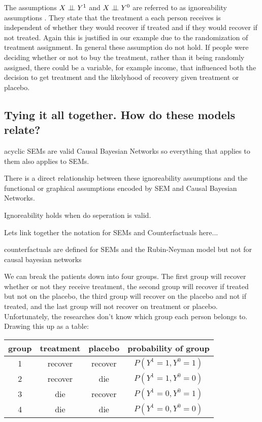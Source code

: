 \documentclass[11pt,a4paper]{article}
\begin{document}
The assumptions $X \perp\!\!\!\perp Y^{1}$ and $X \perp\!\!\!\perp Y^{0}$  are referred to as ignoreability assumptions \cite{}. They state that the treatment a each person receives is independent of whether they would recover if treated and if they would recover if not treated. Again this is justified in our example due to the randomization of treatment assignment. In general these assumption do not hold. If people were deciding whether or not to buy the treatment, rather than it being randomly assigned, there could be a variable, for example income, that influenced both the decision to get treatment and the likelyhood of recovery given treatment or placebo.



\subsection{Tying it all together. How do these models relate?}
acyclic SEMs are valid Causal Bayesian Networks so everything that applies to them also applies to SEMs.

There is a direct relationship between these ignoreability assumptions and the functional or graphical assumptions encoded by SEM and Causal Bayesian Networks.  

Ignoreability holds when do seperation is valid.

Lets link together the notation for SEMs and Counterfactuals here... 

counterfactuals are defined for SEMs and the Rubin-Neyman model but not for causal bayesian networks

We can break the patients down into four groups. The first group will recover whether or not they receive treatment, the second group will recover if treated but not on the placebo, the third group will recover on the placebo and not if treated, and the last group will not recover on treatment or placebo. Unfortunately, the researches don't know which group each person belongs to. Drawing this up as a table:

\begin{tabular}{c|c|c|c}
group & treatment & placebo & probability of group\\
\hline
1 & recover & recover & $P(Y^{1}=1,Y^{0}=1)$\\
2 & recover & die & $P(Y^{1}=1,Y^{0}=0)$\\
3 & die & recover & $P(Y^{1}=0,Y^{0}=1)$\\
4 & die & die & $P(Y^{1}=0,Y^{0}=0)$\\
\end{tabular}
\end{document}
